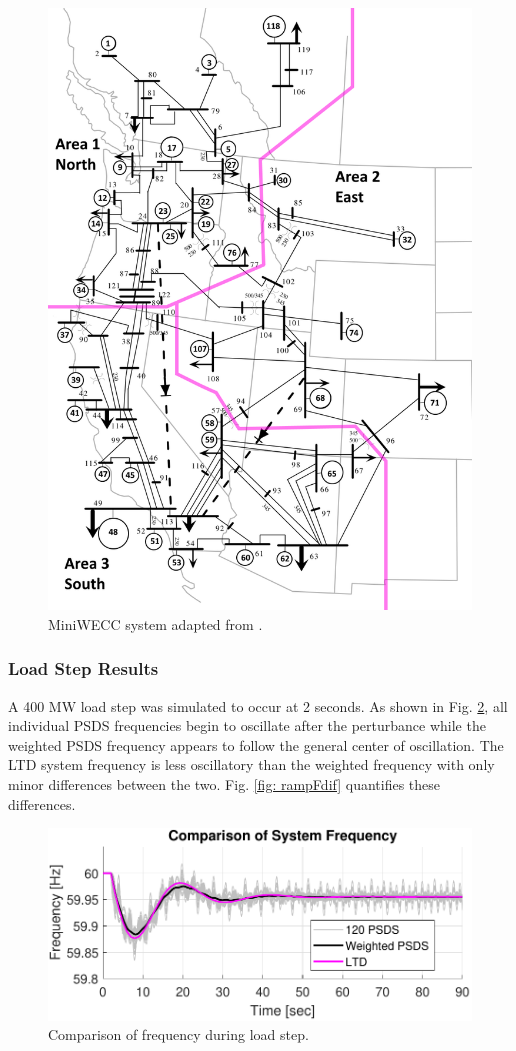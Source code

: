 \begin{figure}[!ht]
	\centering
	\includegraphics[width=.65\linewidth]{figures/miniWECC_split03}
	\caption{MiniWECC system adapted from \cite{RJminiWECC}.}
	\label{fig: miniWECC}
\end{figure}

\subsubsection{Load Step Results}
A 400 MW load step was simulated to occur at 2 seconds.
As shown in Fig. \ref{fig: stepFcomp}, all individual PSDS frequencies begin to oscillate after the perturbance while the weighted PSDS frequency appears to follow the general center of oscillation. The LTD system frequency is less oscillatory than the weighted frequency with only minor differences between the two. Fig. \ref{fig: rampFdif} quantifies these differences.

\begin{figure}[!t]
	\centering
	\includegraphics[width=\linewidth]{figures/miniWECC3ALTDstepF3}
	\caption{Comparison of frequency during load step.}
	\label{fig: stepFcomp}
\end{figure}

